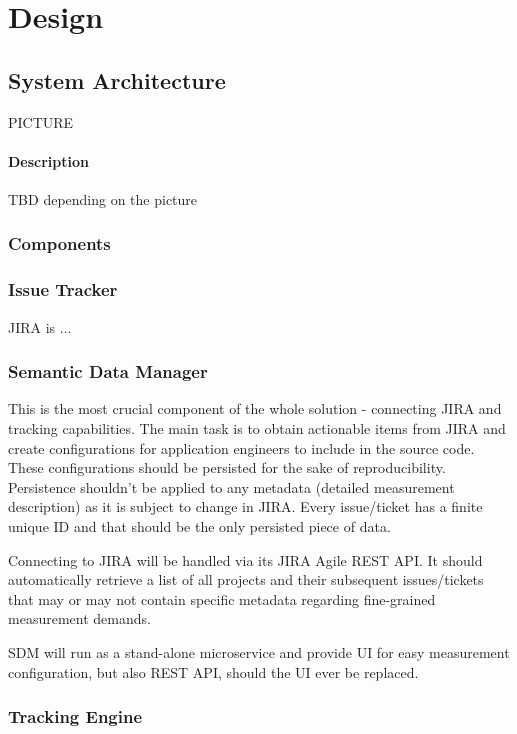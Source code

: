 \chapter{Design}

\section{System Architecture}

PICTURE

\subsubsection*{Description}
TBD depending on the picture


\subsection*{Components}

\subsection{Issue Tracker}

JIRA is ...

\subsection{Semantic Data Manager}

This is the most crucial component of the whole solution - connecting JIRA and tracking capabilities. The main task is to obtain actionable items from JIRA and create configurations for application engineers to include in the source code. These configurations should be persisted for the sake of reproducibility. Persistence shouldn't be applied to any metadata (detailed measurement description) as it is subject to change in JIRA. Every issue/ticket has a finite unique ID and that should be the only persisted piece of data.

Connecting to JIRA will be handled via its JIRA Agile REST API. It should automatically retrieve a list of all projects and their subsequent issues/tickets that may or may not contain specific metadata regarding fine-grained measurement demands.

SDM will run as a stand-alone microservice and provide UI for easy measurement configuration, but also REST API, should the UI ever be replaced.


\subsection{Tracking Engine}

